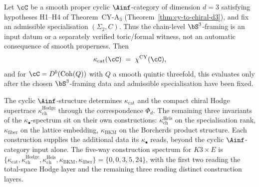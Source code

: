 \begin{conjecture}[Cyclic \texorpdfstring{$\Ainf$}{A-inf} input determines \texorpdfstring{$\kappa_{\mathrm{cat}}$}{kappa-cat} at \texorpdfstring{$d = 3$}{d = 3}]
\label{conj:cyclic-ainf-kappa-cat-d3}
\ClaimStatusConjectured
Let $\cC$ be a smooth proper cyclic $\Ainf$-category of dimension $d = 3$ satisfying hypotheses H1--H4 of Theorem~CY-A$_3$ (Theorem~\ref{thm:cy-to-chiral-d3}), and fix an admissible specialisation $(\Sigma_2,C)$. Thus the chain-level $\bS^3$-framing is an input datum or a separately verified toric/formal witness, not an automatic consequence of smooth properness. Then
\[
 \kappa_{\mathrm{cat}}(\cC) \;=\; \chi^{\mathrm{CY}}(\cC),
\]
and for $\cC = D^b(\mathrm{Coh}(Q))$ with $Q$ a smooth quintic threefold, this evaluates only after the chosen $\bS^3$-framing data and admissible specialisation have been fixed.
\end{conjecture}

\begin{remark}
\label{rem:cyclic-ainf-scope}
The cyclic $\Ainf$-structure determines $\kappa_{\mathrm{cat}}$ and
the compact chiral Hodge supertrace $\kappa_{\mathrm{ch}}^{\mathrm{Hodge}}$ through the
correspondence $\Phi_d$. The remaining three invariants of the
$\kappa_\bullet$-spectrum sit on their own constructions:
$\kappa_{\mathrm{ch}}^{\mathrm{Heis}}$ on the specialisation rank,
$\kappa_{\mathrm{fiber}}$ on the lattice embedding,
$\kappa_{\mathrm{BKM}}$ on the Borcherds product structure. Each
construction supplies the additional data its $\kappa_\bullet$ reads,
beyond the cyclic $\Ainf$-category input alone. The five-way
construction spectrum for $K3 \times E$ is
$\{\kappa_{\mathrm{cat}}, \kappa_{\mathrm{ch}}^{\mathrm{Hodge}},
\kappa_{\mathrm{ch}}^{\mathrm{Heis}}, \kappa_{\mathrm{BKM}}, \kappa_{\mathrm{fiber}}\}
= \{0, 0, 3, 5, 24\}$, with the first two reading the total-space
Hodge layer and the remaining three reading distinct construction
layers.
\end{remark}

